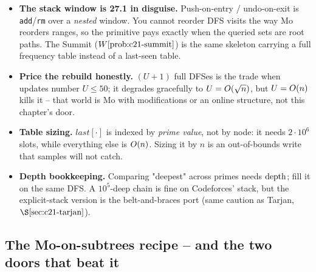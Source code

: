 \begin{hardeningbox}
\begin{itemize}[nosep,leftmargin=1.4em]
  \item \textbf{The stack window is 27.1 in disguise.} Push-on-entry /
        undo-on-exit is \texttt{add}/\texttt{rm} over a \emph{nested} window.
        You cannot reorder DFS visits the way Mo reorders ranges, so the
        primitive pays exactly when the queried sets are root paths.  The
        Summit (\(\probref{c21-summit}\)) is the same skeleton carrying a full
        frequency table instead of a last-seen table.
  \item \textbf{Price the rebuild honestly.} \((U{+}1)\) full DFSes is the
        trade when updates number \(U\le 50\); it degrades gracefully to
        \(U=O(\sqrt n)\), but \(U=O(n)\) kills it -- that world is Mo
        with modifications or an online structure, not this chapter's door.
  \item \textbf{Table sizing.} \(\mathit{last}[\cdot]\) is indexed by
        \emph{prime value}, not by node: it needs \(2\cdot10^6\) slots, while
        everything else is \(O(n)\).  Sizing it by \(n\) is an
        out-of-bounds write that samples will not catch.
  \item \textbf{Depth bookkeeping.} Comparing "deepest" across primes needs
        \(\operatorname{depth}\); fill it on the same DFS.  A \(10^5\)-deep chain is fine on
        Codeforces' stack, but the explicit-stack version is the
        belt-and-braces port (same caution as Tarjan, \(\secref{c21-tarjan}\)).
\end{itemize}
\end{hardeningbox}

\subsection{The Mo-on-subtrees recipe -- and the two doors that beat it}

